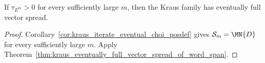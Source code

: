 \begin{theorem}
    \label{thm:kraus_eventually_full_vector_spread_of_choi_posdef}
    \leanok
    If $\tau_{E^m}>0$ for every sufficiently large $m$, then the Kraus family
    has eventually full vector spread.
\end{theorem}

\begin{proof}
    \leanok
    Corollary~\ref{cor:kraus_iterate_eventual_choi_posdef} gives
    $\mathcal S_m=\MN{D}$ for every sufficiently large $m$. Apply
    Theorem~\ref{thm:kraus_eventually_full_vector_spread_of_word_span}.
\end{proof}
